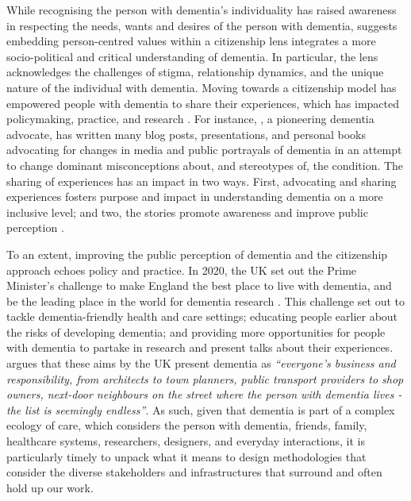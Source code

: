 While recognising the person with dementia's individuality has raised awareness in respecting the needs, wants and desires of the person with dementia, \cite{bartlett_personhood_2007} suggests embedding person-centred values within a citizenship lens integrates a more socio-political and critical understanding of dementia. In particular, the lens acknowledges the challenges of stigma, relationship dynamics, and the unique nature of the individual with dementia. Moving towards a citizenship model has empowered people with dementia to share their experiences, which has impacted policymaking, practice, and research \citep{weetch_involvement_2020}. For instance, \cite{bryden_challenging_2020}, a pioneering dementia advocate, has written many blog posts, presentations, and personal books advocating for changes in media and public portrayals of dementia in an attempt to change dominant misconceptions about, and stereotypes of, the condition. The sharing of experiences has an impact in two ways. First, advocating and sharing experiences fosters purpose and impact in understanding dementia on a more inclusive level; and two, the stories promote awareness and improve public perception \citep{reynolds2017stigma}.

To an extent, improving the public perception of dementia and the citizenship approach echoes policy and practice. In 2020, the UK set out the Prime Minister’s challenge to make England the best place to live with dementia, and be the leading place in the world for dementia research \citep{budgett2021designing}. This challenge set out to tackle dementia-friendly health and care settings; educating people earlier about the risks of developing dementia; and providing more opportunities for people with dementia to partake in research and present talks about their experiences. \cite{keady2017social} argues that these aims by the UK present dementia as \textit{``everyone’s business and responsibility, from architects to town planners, public transport providers to shop owners, next-door neighbours on the street where the person with dementia lives - the list is seemingly endless''}. As such, given that dementia is part of a complex ecology of care, which considers the person with dementia, friends, family, healthcare systems, researchers, designers, and everyday interactions, it is particularly timely to unpack what it means to design methodologies that consider the diverse stakeholders and infrastructures that surround and often hold up our work. 

